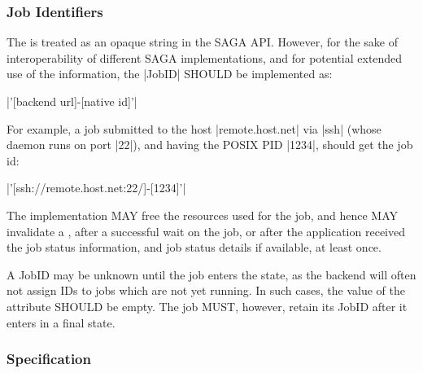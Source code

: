  
  
  \subsubsection{Job Identifiers}
  
    The  is treated as an opaque string in the
    SAGA API.  However, for the sake of interoperability of
    different SAGA implementations, and for potential extended
    use of the  information, the |JobID|
    SHOULD be implemented as:
 
      \shift |'[backend url]-[native id]'|
 
    For example, a job submitted to the host |remote.host.net|
    via |ssh| (whose daemon runs on port |22|), and having the
    POSIX PID |1234|, should get the job id:
 
      \shift |'[ssh://remote.host.net:22/]-[1234]'|
 
    The implementation MAY free the resources used for the job,
    and hence MAY invalidate a , after a
    successful wait on the job, or after the application
    received the job status information, and job status
    details if available, at least once.
 
    A JobID may be unknown until the job enters the
     state, as the backend will often not assign IDs to
    jobs which are not yet running.  In such cases, the value of
    the  attribute SHOULD be empty.  The job MUST,
    however, retain its JobID after it enters in a final state.

      
 
 \subsubsection{Specification}
 
